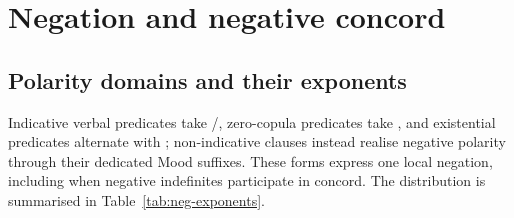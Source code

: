\chapter{Negation and negative concord}\label{ch:negation}

\section{Polarity domains and their exponents}\label{sec:clausal-negation}

Indicative verbal predicates take /, zero-copula
predicates take , and existential predicates alternate
 with ; non-indicative clauses instead realise
negative polarity through their dedicated Mood suffixes. These forms express
one local negation, including when negative indefinites participate in concord.
The distribution is summarised in Table~\ref{tab:neg-exponents}.


